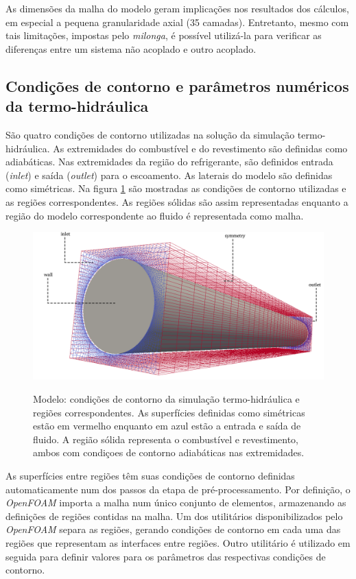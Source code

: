 As dimensões da malha do modelo geram implicações nos resultados dos cálculos, em
especial a pequena granularidade axial (35 camadas). Entretanto, mesmo com tais
limitações, impostas pelo \textit{milonga}, é possível utilizá-la para verificar
as diferenças entre um sistema não acoplado e outro acoplado.


\subsection{Condições de contorno e parâmetros numéricos da termo-hidráulica}
\label{subsec:ccth}

São quatro condições de contorno utilizadas na solução da simulação termo-hidráulica.
As extremidades do combustível e do revestimento são definidas como adiabáticas. Nas
extremidades da região do refrigerante, são definidos entrada (\textit{inlet}) e
saída (\textit{outlet}) para o escoamento. As laterais do modelo são definidas
como simétricas. Na figura \ref{fig:ccth} são mostradas as condições de contorno
utilizadas e as regiões correspondentes. As regiões sólidas são assim representadas
enquanto a região do modelo correspondente ao fluido é representada como malha.

\begin{figure}[htb]
  \caption{Modelo: condições de contorno da simulação termo-hidráulica e regiões
    correspondentes. As superfícies definidas como simétricas estão em vermelho
    enquanto em azul estão a entrada e saída de fluido. A região sólida representa
    o combustível e revestimento, ambos com condiçoes de contorno adiabáticas nas
  extremidades.}
  \centering\includegraphics[scale=0.5]{figuras/inlet_paredes_extremos_wireframe2.png}
  \label{fig:ccth}
\end{figure}

As superfícies entre regiões têm suas condições de contorno definidas automaticamente
num dos passos da etapa de pré-processamento. Por definição, o \textit{OpenFOAM} importa
a malha num único conjunto de elementos, armazenando as definições de regiões
contidas na malha. Um dos utilitários disponibilizados pelo \textit{OpenFOAM} separa
as regiões, gerando condições de contorno em cada uma das regiões que representam
as interfaces entre regiões. Outro utilitário é utilizado em seguida para definir valores
para os parâmetros das respectivas condições de contorno.


